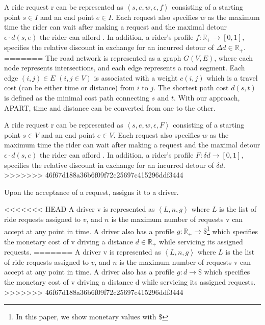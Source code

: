 \begin{definition} 
\label{def:req}
	A ride request r can be represented as $\left\langle s, e, w, \epsilon, f \right\rangle$ consisting of a starting point $s \in I$ and an end point $e \in I$. Each request also specifies $w$ as the maximum time the rider can wait after making a request and the maximal detour $\epsilon\cdot d(s, e)$ the rider can afford . In addition, a rider's profile $f: \mathbb{R}_{+} \rightarrow \left[ 0, 1 \right] $, specifies the relative discount in exchange for an incurred detour of $\Delta d \in \mathbb{R}_{+}$.
=======
The road network is represented as a graph $G(V, E)$, where each node represents intersections, and each edge represents a road segment. 
Each edge $(i,j) \in E$ $(i, j \in V)$ is associated with a weight $c(i,j)$ which is a travel cost (can be either time or distance) from $i$ to $j$.
The shortest path cost $d(s,t)$ is defined as the minimal cost path connecting $s$ and $t$. With our approach, APART, time and distance can be converted from one to the other.

\begin{definition} 
\label{def:req}
A ride request r can be represented as $\left\langle s, e, w, \epsilon, F \right\rangle$ consisting of a starting point $s \in V$ and an end point $e \in V$. Each request also specifies $w$ as the maximum time the rider can wait after making a request and the maximal detour $\epsilon\cdot d(s, e)$ the rider can afford . In addition, a rider's profile $F: \delta d \rightarrow \left[ 0, 1 \right] $, specifies the relative discount in exchange for an incurred detour of $\delta d$.
>>>>>>> 46f67d188a36b6f09f72c25697c415296ddf3444
\end{definition}

Upon the acceptance of a request, \fname assigns it to a driver.

\begin{definition} [Driver]
<<<<<<< HEAD
A driver v is represented as $\left\langle L, n, g \right\rangle$ where $L$ is the list of ride requests assigned to $v$, and $n$ is the maximum number of requests v can accept at any point in time. A driver also has a profile $g: \mathbb{R}_{+}  \rightarrow \$ $\footnote{In this paper, we show monetary values with $\$ $} which specifies the monetary cost of v driving a distance $d \in \mathbb{R}_{+}$ while servicing its assigned requests.
=======
A driver v is represented as $\left\langle L, n, g \right\rangle$ where $L$ is the list of ride requests assigned to $v$, and $n$ is the maximum number of requests v can accept at any point in time. A driver also has a profile $g: d \rightarrow \$ $ which specifies the monetary cost of v driving a distance d while servicing its assigned requests.
>>>>>>> 46f67d188a36b6f09f72c25697c415296ddf3444
\end{definition} 


\end{definition}
